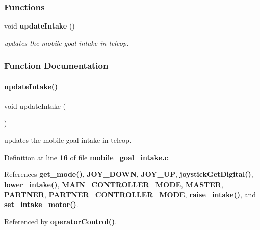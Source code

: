 \subsubsection*{Functions}
\begin{DoxyCompactItemize}
\item 
void \textbf{ update\+Intake} ()
\begin{DoxyCompactList}\small\item\em updates the mobile goal intake in teleop. \end{DoxyCompactList}\end{DoxyCompactItemize}


\subsubsection{Function Documentation}
\mbox{\label{mobile__goal__intake_8h_ad0232c21c5c1ffda603d2b7d61034118}} 
\paragraph{update\+Intake()}
{\footnotesize\ttfamily void update\+Intake (\begin{DoxyParamCaption}{ }\end{DoxyParamCaption})}



updates the mobile goal intake in teleop. 



Definition at line \textbf{ 16} of file \textbf{ mobile\+\_\+goal\+\_\+intake.\+c}.



References \textbf{ get\+\_\+mode()}, \textbf{ J\+O\+Y\+\_\+\+D\+O\+WN}, \textbf{ J\+O\+Y\+\_\+\+UP}, \textbf{ joystick\+Get\+Digital()}, \textbf{ lower\+\_\+intake()}, \textbf{ M\+A\+I\+N\+\_\+\+C\+O\+N\+T\+R\+O\+L\+L\+E\+R\+\_\+\+M\+O\+DE}, \textbf{ M\+A\+S\+T\+ER}, \textbf{ P\+A\+R\+T\+N\+ER}, \textbf{ P\+A\+R\+T\+N\+E\+R\+\_\+\+C\+O\+N\+T\+R\+O\+L\+L\+E\+R\+\_\+\+M\+O\+DE}, \textbf{ raise\+\_\+intake()}, and \textbf{ set\+\_\+intake\+\_\+motor()}.



Referenced by \textbf{ operator\+Control()}.



